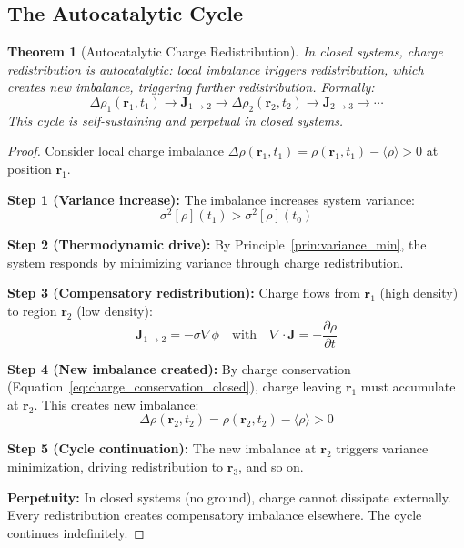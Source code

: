 \documentclass[12pt,a4paper]{article}
\theoremstyle{plain}
\newtheorem{theorem}{Theorem}[section]
\theoremstyle{definition}
\theoremstyle{remark}
\begin{document}
\subsection{The Autocatalytic Cycle}

\begin{theorem}[Autocatalytic Charge Redistribution]
\label{thm:autocatalytic}
In closed systems, charge redistribution is autocatalytic: local imbalance triggers redistribution, which creates new imbalance, triggering further redistribution. Formally:
\begin{equation}
\Delta \rho_1(\mathbf{r}_1, t_1) \to \mathbf{J}_{1 \to 2} \to \Delta \rho_2(\mathbf{r}_2, t_2) \to \mathbf{J}_{2 \to 3} \to \cdots
\end{equation}
This cycle is self-sustaining and perpetual in closed systems.
\end{theorem}

\begin{proof}
Consider local charge imbalance $\Delta \rho(\mathbf{r}_1, t_1) = \rho(\mathbf{r}_1, t_1) - \langle \rho \rangle > 0$ at position $\mathbf{r}_1$.

\textbf{Step 1 (Variance increase):} The imbalance increases system variance:
\begin{equation}
\sigma^2[\rho](t_1) > \sigma^2[\rho](t_0)
\end{equation}

\textbf{Step 2 (Thermodynamic drive):} By Principle~\ref{prin:variance_min}, the system responds by minimizing variance through charge redistribution.

\textbf{Step 3 (Compensatory redistribution):} Charge flows from $\mathbf{r}_1$ (high density) to region $\mathbf{r}_2$ (low density):
\begin{equation}
\mathbf{J}_{1 \to 2} = -\sigma \nabla \phi \quad \text{with} \quad \nabla \cdot \mathbf{J} = -\frac{\partial \rho}{\partial t}
\end{equation}

\textbf{Step 4 (New imbalance created):} By charge conservation (Equation~\ref{eq:charge_conservation_closed}), charge leaving $\mathbf{r}_1$ must accumulate at $\mathbf{r}_2$. This creates new imbalance:
\begin{equation}
\Delta \rho(\mathbf{r}_2, t_2) = \rho(\mathbf{r}_2, t_2) - \langle \rho \rangle > 0
\end{equation}

\textbf{Step 5 (Cycle continuation):} The new imbalance at $\mathbf{r}_2$ triggers variance minimization, driving redistribution to $\mathbf{r}_3$, and so on.

\textbf{Perpetuity:} In closed systems (no ground), charge cannot dissipate externally. Every redistribution creates compensatory imbalance elsewhere. The cycle continues indefinitely.
\end{proof}
\end{document}
